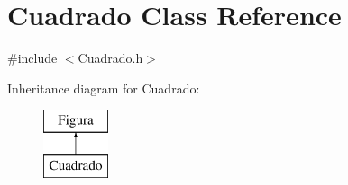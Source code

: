 \hypertarget{class_cuadrado}{}\section{Cuadrado Class Reference}
\label{class_cuadrado}


{\ttfamily \#include $<$Cuadrado.\+h$>$}

Inheritance diagram for Cuadrado\+:\begin{figure}[H]
\begin{center}
\leavevmode
\includegraphics[height=2.000000cm]{class_cuadrado}
\end{center}
\end{figure}
